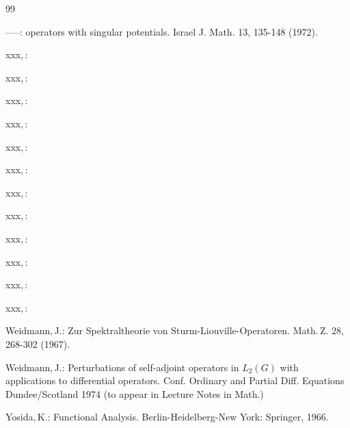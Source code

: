 \documentclass[11pt,twoside]{article}
\begin{document}
\begin{thebibliography}{99}
\begin{small}
  -----:
{\SCHROEDINGER} operators with singular potentials.
Israel J. Math. 13, 135-148 (1972).

  xxx,\,:

  xxx,\,:

  xxx,\,:

  xxx,\,:

  xxx,\,:

  xxx,\,:

  xxx,\,:

  xxx,\,:

  xxx,\,:

  xxx,\,:

  xxx,\,:

  xxx,\,:

  Weidmann,\,J.:
Zur Spektraltheorie von Sturm-Liouville-Operatoren.
Math.\,Z. 28, 268-302 (1967).

  Weidmann,\,J.:
Perturbations of self-adjoint operators in $L_2(G)$ with applications
to differential operators.
Conf. Ordinary and Partial Diff. Equations Dundee/Scotland 1974 (to appear in 
Lecture Notes in Math.)

  Yosida,\,K.:
Functional Analysis.
Berlin-Heidelberg-New York:
Springer, 1966.

\end{small}
\end{thebibliography}
\end{document}
